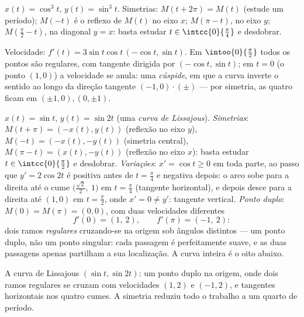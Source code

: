 \begin{example}[A astroide]\label{ex:b1:curves:astroid}
$x(t) = \cos^3 t$, $y(t) = \sin^3 t$. Simetrias: $M(t + 2\pi) = M(t)$ (estude um período);
$M(-t)$ é o reflexo de $M(t)$ no eixo $x$; $M(\pi - t)$, no eixo $y$; $M(\frac\pi2 -
t)$,
na diagonal $y = x$: basta estudar $t \in
\intcc{0}{\frac\pi4}$ e desdobrar.

Velocidade: $f'(t) = 3\sin t\cos t\,(-\cos t, \sin t)$. Em $\intoo{0}{\frac\pi2}$ todos os pontos são regulares, com
tangente dirigida por $(-\cos t, \sin t)$; em $t = 0$ (o ponto $(1,0)$) a
velocidade se anula: uma \emph{cúspide}, em que a
curva inverte o sentido ao longo da direção tangente $(-1, 0)\cdot(\pm)$ --- por
simetria, as quatro  ficam em $(\pm1, 0), (0, \pm1)$.
\end{example}

\begin{example}
\label{ex:b1:curves:lissajous}
$x(t) = \sin t$, $y(t) = \sin 2t$ (uma \emph{curva de Lissajous}). \emph{Simetrias}:
$M(t + \pi) = (-x(t), y(t))$ (reflexão no eixo $y$), $M(-t) = (-x(t), -y(t))$ (simetria central), $M(\pi - t) = (x(t), -y(t))$
(reflexão no eixo $x$): basta estudar $t \in \intcc{0}{\frac\pi2}$ e desdobrar.
\emph{Variações}: $x' = \cos t \geq 0$ em toda parte, ao passo que $y' =
2\cos 2t$ é positiva
antes de $t = \frac\pi4$ e negativa depois: o arco sobe para a direita até o
cume $\bigl(\frac{\sqrt2}2,\ 1\bigr)$ em $t = \frac\pi4$ (tangente horizontal), e depois desce para a
direita até $(1, 0)$ em $t =
\frac\pi2$, onde $x' = 0 \neq y'$: tangente vertical.
\emph{Ponto duplo}: $M(0) = M(\pi) = (0,0)$, com duas velocidades diferentes
\[
f'(0) = (1,\ 2), \qquad f'(\pi) = (-1,\ 2) :
\]
dois ramos \emph{regulares} cruzando-se na origem sob ângulos
distintos --- um ponto duplo, não um ponto singular: cada passagem é
perfeitamente suave, e as duas passagens apenas partilham a sua
localização. A curva inteira é o oito abaixo.
\end{example}

\begin{omfigure}

{\small A curva de Lissajous $(\sin t, \sin 2t)$: um ponto duplo na origem, onde
dois ramos regulares se cruzam com velocidades $(1, 2)$ e $(-1, 2)$,
e tangentes horizontais nos quatro cumes. A simetria reduziu todo o
trabalho a um quarto de período.}
\end{omfigure}

